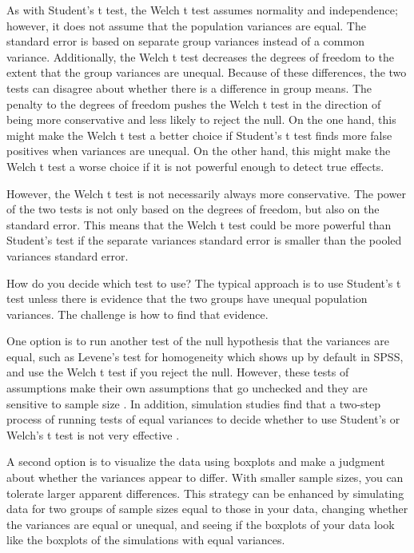 \documentclass[man,a4paper,noextraspace,apacite]{apa6}
\begin{document}
        As with Student's t test, the Welch t test assumes normality and independence; however, it does not assume that the population variances are equal. The standard error is based on separate group variances instead of a common variance. Additionally, the Welch t test decreases the degrees of freedom to the extent that the group variances are unequal. Because of these differences, the two tests can disagree about whether there is a difference in group means. The penalty to the degrees of freedom pushes the Welch t test in the direction of being more conservative and less likely to reject the null. On the one hand, this might make the Welch t test a better choice if Student's t test finds more false positives when variances are unequal. On the other hand, this might make the Welch t test a worse choice if it is not powerful enough to detect true effects. 
        
    However, the Welch t test is not necessarily always more conservative. The power of the two tests is not only based on the degrees of freedom, but also on the standard error. This means that the Welch t test could be more powerful than Student's test if the separate variances standard error is smaller than the pooled variances standard error. 
    
    How do you decide which test to use? The typical approach is to use Student's t test unless there is evidence that the two groups have unequal population variances. The challenge is how to find that evidence. 

    One option is to run another test of the null hypothesis that the variances are equal, such as Levene's test for homogeneity which shows up by default in SPSS, and use the Welch t test if you reject the null. However, these tests of assumptions make their own assumptions that go unchecked and they are sensitive to sample size \cite{Gonzalez2008}. In addition, simulation studies find that a two-step process of running tests of equal variances to decide whether to use Student's or Welch's t test is not very effective \cite{Zimmerman1996,Zimmerman2004}. 

    A second option is to visualize the data using boxplots and make a judgment about whether the variances appear to differ.  With smaller sample sizes, you can tolerate larger apparent differences. This strategy can be enhanced by simulating data for two groups of sample sizes equal to those in your data, changing whether the variances are equal or unequal, and seeing if the boxplots of your data look like the boxplots of the simulations with equal variances. 
\end{document}
